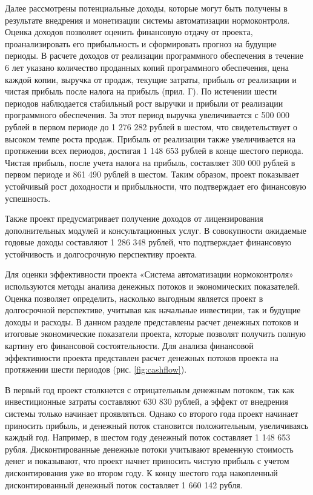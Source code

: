 \documentclass{report}
\begin{document}
Далее рассмотрены потенциальные доходы, которые могут быть получены в результате внедрения и монетизации системы автоматизации нормоконтроля. Оценка доходов позволяет оценить финансовую отдачу от проекта, проанализировать его прибыльность и сформировать прогноз на будущие периоды. 
В расчете доходов от реализации программного обеспечения в течение 6 лет указано количество проданных копий программного обеспечения, цена каждой копии, выручка от продаж, текущие затраты, прибыль от реализации и чистая прибыль после налога на прибыль (прил. Г). По истечении шести периодов наблюдается стабильный рост выручки и прибыли от реализации программного обеспечения. За этот период выручка увеличивается с 500 000 рублей в первом периоде до 1 276 282 рублей в шестом, что свидетельствует о высоком темпе роста продаж. Прибыль от реализации также увеличивается на протяжении всех периодов, достигая 1 148 653 рублей в конце шестого периода. Чистая прибыль, после учета налога на прибыль, составляет 300 000 рублей в первом периоде и 861 490 рублей в шестом. Таким образом, проект показывает устойчивый рост доходности и прибыльности, что подтверждает его финансовую успешность.

Также проект предусматривает получение доходов от лицензирования дополнительных модулей и консультационных услуг. В совокупности ожидаемые годовые доходы составляют 1 286 348 рублей, что подтверждает финансовую устойчивость и долгосрочную перспективу проекта.

Для оценки эффективности проекта «Система автоматизации нормоконтроля» используются методы анализа денежных потоков и экономических показателей. Оценка позволяет определить, насколько выгодным является проект в долгосрочной перспективе, учитывая как начальные инвестиции, так и будущие доходы и расходы. В данном разделе представлены расчет денежных потоков и итоговые экономические показатели проекта, которые позволят получить полную картину его финансовой состоятельности.
Для анализа финансовой эффективности проекта представлен расчет денежных потоков проекта на протяжении шести периодов (рис. \ref{fig:cashflow}). 


В первый год проект столкнется с отрицательным денежным потоком, так как инвестиционные затраты составляют 630 830 рублей, а эффект от внедрения системы только начинает проявляться. Однако со второго года проект начинает приносить прибыль, и денежный поток становится положительным, увеличиваясь каждый год. Например, в шестом году денежный поток составляет 1 148 653 рубля. Дисконтированные денежные потоки учитывают временную стоимость денег и показывают, что проект начнет приносить чистую прибыль с учетом дисконтирования уже во втором году. К концу шестого года накопленный дисконтированный денежный поток составляет 1 660 142 рубля.
\end{document}
